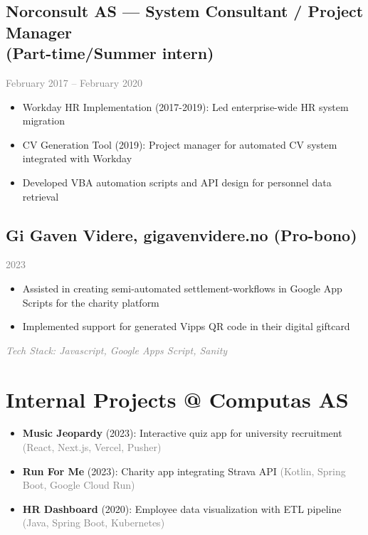 \documentclass[11pt,a4paper]{article}
\begin{document}
\subsection{Norconsult AS — System Consultant / Project Manager \\ (Part-time/Summer intern)}
\textcolor{gray}{February 2017 – February 2020}
\begin{itemize}[itemsep=0.3em, leftmargin=*]
\item Workday HR Implementation (2017-2019): Led enterprise-wide HR system migration
\item CV Generation Tool (2019): Project manager for automated CV system integrated with Workday
\item Developed VBA automation scripts and API design for personnel data retrieval
\end{itemize}

\vspace{10pt}

\subsection{Gi Gaven Videre, gigavenvidere.no (Pro-bono)}
\textcolor{gray}{2023}
\begin{itemize}[itemsep=0.3em, leftmargin=*]
\item Assisted in creating semi-automated settlement-workflows in Google App Scripts for the charity platform  
\item Implemented support for generated Vipps QR code in their digital giftcard
\end{itemize}
\textcolor{gray}{\textit{Tech Stack: Javascript, Google Apps Script, Sanity  }}

\vspace{10pt}
\section{Internal Projects @ Computas AS}

\begin{itemize}[itemsep=0.5em, leftmargin=*]
\item \textbf{Music Jeopardy} (2023): Interactive quiz app for university recruitment \textcolor{gray}{(React, Next.js, Vercel, Pusher)}
\item \textbf{Run For Me} (2023): Charity app integrating Strava API \textcolor{gray}{(Kotlin, Spring Boot, Google Cloud Run)}
\item \textbf{HR Dashboard} (2020): Employee data visualization with ETL pipeline \textcolor{gray}{(Java, Spring Boot, Kubernetes)}
\end{itemize}
\end{document}
